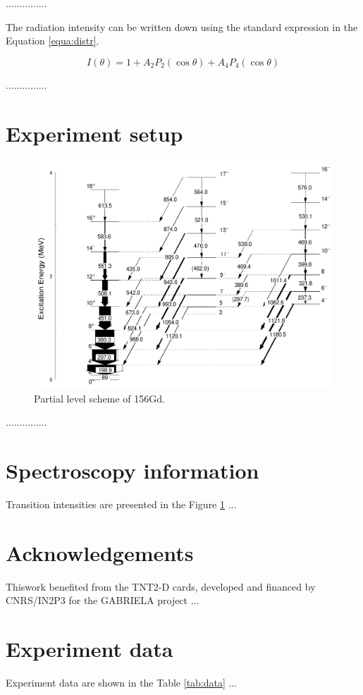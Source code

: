 \documentclass[final, 5p,12pt]{elsarticle}
\begin{document}
...............

The radiation intensity can be written down using the
standard expression in the Equation \ref{equa:distr}.

\begin{equation}
\label{equa:distr}
I(\theta) = 1 + A_{2}P_{2}(\cos{\theta}) + A_{4}P_{4}(\cos{\theta})
\end{equation}

...............

\section{Experiment setup}

\begin{figure}[!htb]
\centering
\includegraphics[width=0.5\linewidth]{156Gd.png}
\caption{Partial level scheme of 156Gd.}
\label{fig:156Gd}
\end{figure}

...............

\section{Spectroscopy information}
Transition intensities are presented in the Figure \ref{fig:156Gd} ... 

\section{Acknowledgements}

Thiswork benefited from the TNT2-D cards, developed and
financed by CNRS/IN2P3 for the GABRIELA project ...


\appendix
\section{Experiment data}
\label{app:expdata}

Experiment data are shown in the Table \ref{tab:data} ... 
\end{document}
